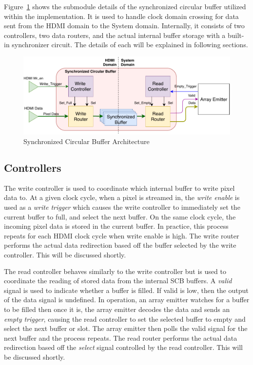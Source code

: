     Figure~\ref{fig:scb_arch} shows the submodule details of the synchronized circular buffer utilized within the implementation. It is used to handle clock domain crossing for data sent from the HDMI domain to the System domain. Internally, it consists of two controllers, two data routers, and the actual internal buffer storage with a built-in synchronizer circuit. The details of each will be explained in following sections.

    \begin{figure}
        \centering
        \includegraphics[width=1.0\textwidth]{fig/pdp_scb_arch.pdf}
        \caption{Synchronized Circular Buffer Architecture}
        \label{fig:scb_arch}
    \end{figure}

    \subsection{Controllers}
        The write controller is used to coordinate which internal buffer to write pixel data to. At a given clock cycle, when a pixel is streamed in, the {\it write enable} is used as a {\it write trigger} which causes the write controller to immediately set the current buffer to full, and select the next buffer. On the same clock cycle, the incoming pixel data is stored in the current buffer. In practice, this process repeats for each HDMI clock cycle when write enable is high. The write router performs the actual data redirection based off the buffer selected by the write controller. This will be discussed shortly.

        The read controller behaves similarly to the write controller but is used to coordinate the reading of stored data from the internal SCB buffers. A {\it valid} signal is used to indicate whether a buffer is filled. If valid is low, then the output of the data signal is undefined. In operation, an array emitter watches for a buffer to be filled then once it is, the array emitter decodes the data and sends an {\it empty trigger}, causing the read controller to set the selected buffer to empty and select the next buffer or slot. The array emitter then polls the valid signal for the next buffer and the process repeats. The read router performs the actual data redirection based off the {\it select} signal controlled by the read controller. This will be discussed shortly.

